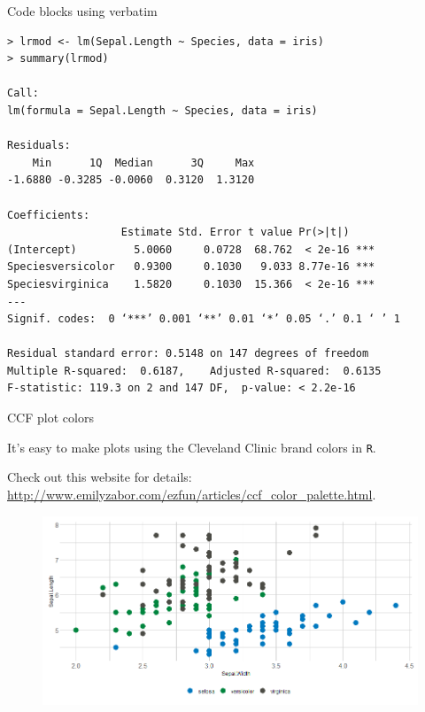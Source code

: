\documentclass{beamer}
\begin{document}


\begin{frame}[fragile]{Code blocks using verbatim}

\tiny
\begin{verbatim}
> lrmod <- lm(Sepal.Length ~ Species, data = iris)
> summary(lrmod)

Call:
lm(formula = Sepal.Length ~ Species, data = iris)

Residuals:
    Min      1Q  Median      3Q     Max 
-1.6880 -0.3285 -0.0060  0.3120  1.3120 

Coefficients:
                  Estimate Std. Error t value Pr(>|t|)    
(Intercept)         5.0060     0.0728  68.762  < 2e-16 ***
Speciesversicolor   0.9300     0.1030   9.033 8.77e-16 ***
Speciesvirginica    1.5820     0.1030  15.366  < 2e-16 ***
---
Signif. codes:  0 ‘***’ 0.001 ‘**’ 0.01 ‘*’ 0.05 ‘.’ 0.1 ‘ ’ 1

Residual standard error: 0.5148 on 147 degrees of freedom
Multiple R-squared:  0.6187,	Adjusted R-squared:  0.6135 
F-statistic: 119.3 on 2 and 147 DF,  p-value: < 2.2e-16
\end{verbatim}

\end{frame}




\begin{frame}[fragile]{CCF plot colors}

\small
It's easy to make plots using the Cleveland Clinic brand colors in \verb!R!. 

Check out this website for details: 
\url{http://www.emilyzabor.com/ezfun/articles/ccf_color_palette.html}.

\begin{figure}
    \includegraphics[scale=0.45]{./figs/example_ggplot}  
\end{figure}

\end{frame}


\end{document}
